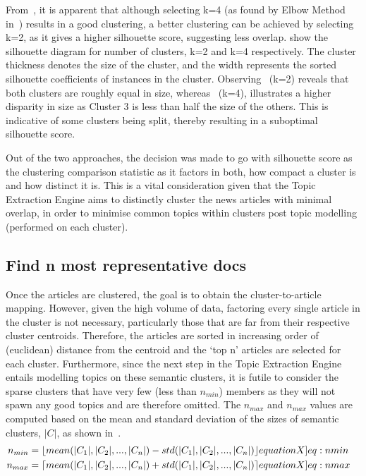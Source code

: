 \vspace*{-1.5ex}
From~, it is apparent that although selecting k=4 (as found by Elbow Method in~) results in a good clustering, a better clustering can be achieved by selecting k=2, as it gives a higher silhouette score, suggesting less overlap.  show the silhouette diagram for number of clusters, k=2 and k=4 respectively. The cluster thickness denotes the size of the cluster, and the width represents the sorted silhouette coefficients of instances in the cluster. Observing~ (k=2) reveals that both clusters are roughly equal in size, whereas~ (k=4), illustrates a higher disparity in size as Cluster 3 is less than half the size of the others. This is indicative of some clusters being split, thereby resulting in a suboptimal silhouette score. 

Out of the two approaches, the decision was made to go with silhouette score as the clustering comparison statistic as it factors in both, how compact a cluster is and how distinct it is. This is a vital consideration given that the Topic Extraction Engine aims to distinctly cluster the news articles with minimal overlap, in order to minimise common topics within clusters post topic modelling (performed on each cluster). 

\subsection*{Find n most representative docs} \label{sec:Find_n_docs}

Once the articles are clustered, the goal is to obtain the cluster-to-article mapping. However, given the high volume of data, factoring every single article in the cluster is not necessary, particularly those that are far from their respective cluster centroids. Therefore, the articles are sorted in increasing order of (euclidean) distance from the centroid and the `top n' articles are selected for each cluster. Furthermore, since the next step in the Topic Extraction Engine entails modelling topics on these semantic clusters, it is futile to consider the sparse clusters that have very few (less than $n_{min}$) members as they will not spawn any good topics and are therefore omitted. The $n_{max}$ and $n_{max}$ values are computed based on the mean and standard deviation of the sizes of semantic clusters, $|C|$, as shown in~.
\vspace{-1.5px}
\begin{align}
  n_{min} &= \lfloor mean(|C_1|, |C_2|, ..., |C_n|) - std(|C_1|, |C_2|, ..., |C_n|) \rfloor \label[equationX]{eq:nmin} &\\
  n_{max} &= \lceil mean(|C_1|, |C_2|, ..., |C_n|) + std(|C_1|, |C_2|, ..., |C_n|) \rceil \label[equationX]{eq:nmax}
\end{align}

